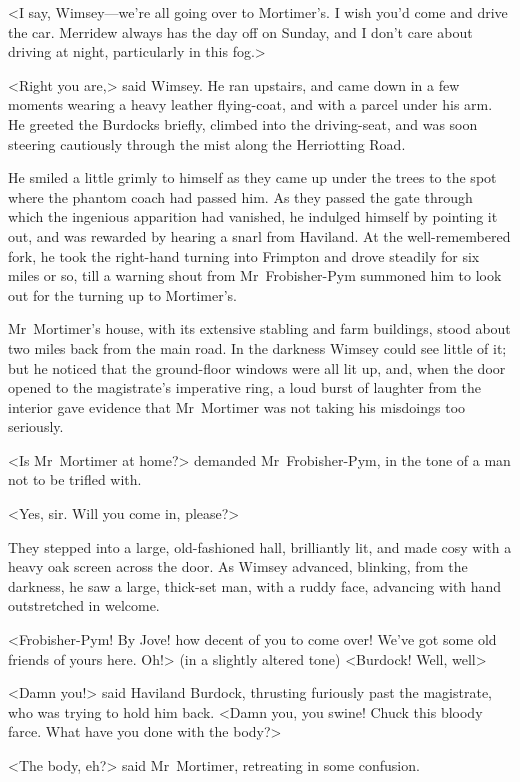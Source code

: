 <I say, Wimsey—we're all going over to Mortimer's. I wish you'd come and drive the car. Merridew always has the day off on Sunday, and I don't care about driving at night, particularly in this fog.>

<Right you are,> said Wimsey. He ran upstairs, and came down in a few moments wearing a heavy leather flying-coat, and with a parcel under his arm. He greeted the Burdocks briefly, climbed into the driving-seat, and was soon steering cautiously through the mist along the Herriotting Road.

He smiled a little grimly to himself as they came up under the trees to the spot where the phantom coach had passed him. As they passed the gate through which the ingenious apparition had vanished, he indulged himself by pointing it out, and was rewarded by hearing a snarl from Haviland. At the well-remembered fork, he took the right-hand turning into Frimpton and drove steadily for six miles or so, till a warning shout from Mr~Frobisher-Pym summoned him to look out for the turning up to Mortimer's.

Mr~Mortimer's house, with its extensive stabling and farm buildings, stood about two miles back from the main road. In the darkness Wimsey could see little of it; but he noticed that the ground-floor windows were all lit up, and, when the door opened to the magistrate's imperative ring, a loud burst of laughter from the interior gave evidence that Mr~Mortimer was not taking his misdoings too seriously.

<Is Mr~Mortimer at home?> demanded Mr~Frobisher-Pym, in the tone of a man not to be trifled with.

<Yes, sir. Will you come in, please?>

They stepped into a large, old-fashioned hall, brilliantly lit, and made cosy with a heavy oak screen across the door. As Wimsey advanced, blinking, from the darkness, he saw a large, thick-set man, with a ruddy face, advancing with hand outstretched in welcome.

<Frobisher-Pym! By Jove! how decent of you to come over! We've got some old friends of yours here. Oh!> (in a slightly altered tone) <Burdock! Well, well\longdash>

<Damn you!> said Haviland Burdock, thrusting furiously past the magistrate, who was trying to hold him back. <Damn you, you swine! Chuck this bloody farce. What have you done with the body?>

<The body, eh?> said Mr~Mortimer, retreating in some confusion.

